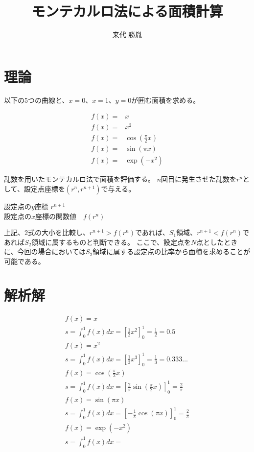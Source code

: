 \documentclass[12pt,a4paper]{jsarticle}
\author{来代 勝胤}
\title{モンテカルロ法による面積計算}
\begin{document}
\maketitle
\thispagestyle{empty}
\clearpage
\addtocounter{page}{-1}


\begin{flushleft}
    {
        \LARGE \textbf{}
    }
\end{flushleft}

\section{理論}

以下の5つの曲線と、$x=0$、$x=1$、$y=0$が囲む面積を求める。

\begin{eqnarray}
    f(x)=&x\\
    f(x)=&x^2\\
    f(x)=&\cos\left(\frac{\pi}{2}x\right)\\
    f(x)=&\sin\left(\pi x\right) \\
    f(x)=&\exp\left(-x^2\right)
\end{eqnarray}

乱数を用いたモンテカルロ法で面積を評価する。
$n$回目に発生させた乱数を$r^n$として、設定点座標を$\left(r^n, r^{n+1}\right)$で与える。\\
\begin{center}
    設定点の$y$座標          $r^{n+1}$\\
    設定点の$x$座標の関数値　$f\left(r^n\right)$
\end{center}
上記、2式の大小を比較し、$r^{n+1}>f(r^n)$であれば、$S_1$領域、$r^{n+1}<f(r^n)$であれば$S_2$領域に属するものと判断できる。
ここで、設定点を$N$点としたときに、今回の場合においては$S_2$領域に属する設定点の比率から面積を求めることが可能である。\\
\section{解析解}
\begin{eqnarray*}
    f\left(x\right)=x\\
    s=\int_0^1f\left(x\right)dx=\left[\frac{1}{2}x^2\right]_0^1=\frac{1}{2}=0.5\\
    f\left(x\right)=x^2\\
    s=\int_0^1f\left(x\right)dx=\left[\frac{1}{3}x^3\right]_0^1=\frac{1}{3}=0.333\dots\\
    f\left(x\right)=\cos\left(\frac{\pi}{2}x\right)\\
    s=\int_0^1f\left(x\right)dx=\left[\frac{2}{\pi}\sin\left(\frac{\pi}{2}x\right)\right]_0^1=\frac{2}{\pi}\\
    f\left(x\right)=\sin\left(\pi x\right)\\
    s=\int_0^1f\left(x\right)dx=\left[-\frac{1}{\pi}\cos\left(\pi x\right)\right]_0^1=\frac{2}{\pi}\\
    f\left(x\right)=\exp\left(-x^2\right)\\
    s=\int_0^1f\left(x\right)dx=
\end{eqnarray*}
\newpage
\end{document}
